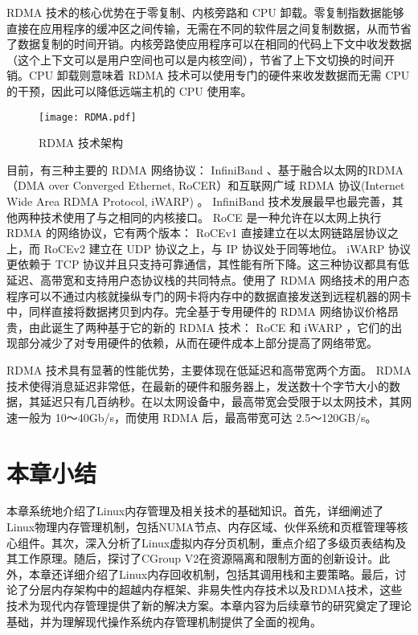  RDMA 技术的核心优势在于零复制、内核旁路和 CPU 卸载。零复制指数据能够直接在应用程序的缓冲区之间传输，无需在不同的软件层之间复制数据，从而节省了数据复制的时间开销。内核旁路使应用程序可以在相同的代码上下文中收发数据（这个上下文可以是用户空间也可以是内核空间），节省了上下文切换的时间开销。CPU 卸载则意味着 RDMA 技术可以使用专门的硬件来收发数据而无需 CPU 的干预，因此可以降低远端主机的 CPU 使用率。

\begin{figure}[htb]
    \centering
    \texttt{[image: RDMA.pdf]}
    \caption{RDMA 技术架构}
    \label{fig:RDMA}
\end{figure}

目前，有三种主要的 RDMA 网络协议： InfiniBand 、基于融合以太网的RDMA（DMA over Converged Ethernet, RoCER）和互联网广域 RDMA 协议(Internet Wide Area RDMA Protocol, iWARP) 。 InfiniBand 技术发展最早也最完善，其他两种技术使用了与之相同的内核接口。 RoCE 是一种允许在以太网上执行 RDMA 的网络协议，它有两个版本： RoCEv1 直接建立在以太网链路层协议之上，而 RoCEv2 建立在 UDP 协议之上，与 IP 协议处于同等地位。 iWARP 协议更依赖于 TCP 协议并且只支持可靠通信，其性能有所下降。这三种协议都具有低延迟、高带宽和支持用户态协议栈的共同特点。使用了 RDMA 网络技术的用户态程序可以不通过内核就操纵专门的网卡将内存中的数据直接发送到远程机器的网卡中，同样直接将数据拷贝到内存。完全基于专用硬件的 RDMA 网络协议价格昂贵，由此诞生了两种基于它的新的 RDMA 技术： RoCE 和 iWARP ，它们的出现部分减少了对专用硬件的依赖，从而在硬件成本上部分提高了网络带宽。

 RDMA 技术具有显著的性能优势，主要体现在低延迟和高带宽两个方面。 RDMA 技术使得消息延迟非常低，在最新的硬件和服务器上，发送数十个字节大小的数据，其延迟只有几百纳秒。在以太网设备中，最高带宽会受限于以太网技术，其网速一般为 10～40Gb/s，而使用 RDMA 后，最高带宽可达 2.5～120GB/s。

\section{本章小结}

本章系统地介绍了Linux内存管理及相关技术的基础知识。首先，详细阐述了Linux物理内存管理机制，包括NUMA节点、内存区域、伙伴系统和页框管理等核心组件。其次，深入分析了Linux虚拟内存分页机制，重点介绍了多级页表结构及其工作原理。随后，探讨了CGroup V2在资源隔离和限制方面的创新设计。此外，本章还详细介绍了Linux内存回收机制，包括其调用栈和主要策略。最后，讨论了分层内存架构中的超越内存框架、非易失性内存技术以及RDMA技术，这些技术为现代内存管理提供了新的解决方案。本章内容为后续章节的研究奠定了理论基础，并为理解现代操作系统内存管理机制提供了全面的视角。